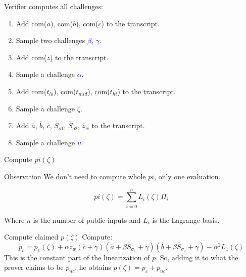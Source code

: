 \documentclass{zkdl-presentation-template}
\begin{document}
    \begin{frame} {Verifier computes all challenges:}
        \begin{enumerate}
            \item Add com($a$), com($b$), com($c$) to the transcript.
            \item Sample two challenges \textcolor{blue}{$\beta$, $\gamma$}.
            \item Add com($z$) to the transcript.
            \item Sample a challenge \textcolor{blue}{$\alpha$}.
            \item Add com($t_{lo}$), com($t_{mid}$), com($t_{hi}$) to the transcript.
            \item Sample a challenge \textcolor{blue}{$\zeta$}.
            \item Add $\bar{a}$, $\bar{b}$, $\bar{c}$, $\bar{S}_{o1}$, $\bar{S}_{o2}$, $\bar{z}_w$ to the transcript.
            \item Sample a challenge \textcolor{blue}{$\upsilon$}.
        \end{enumerate}
    \end{frame}

    \begin{frame} {Compute $pi(\zeta)$}
        \begin{block}{Observation}
            We don't need to compute whole $pi$, only one evaluation.
        \end{block}

        \begin{equation*}
            pi(\zeta) = \sum_{i=0}^{n} L_{i}(\zeta) \Pi_i
        \end{equation*}
        
        Where $n$ is the number of public inputs and $L_i$ is the Lagrange basis.
    \end{frame}

    \begin{frame} {Compute claimed $p(\zeta)$}
        Compute: 
        \[\bar{p}_c = p_1(\zeta) + \alpha z_{w} \left( \bar{c} + \gamma \right) \left( \bar{a} + \beta \bar{S}_{\sigma_1} + \gamma \right) \left( \bar{b} + \beta \bar{S}_{\sigma_2} + \gamma \right) - \alpha^2 L_1(\zeta)\]
        This is the constant part of the linearization of $p$. So, adding it to what the prover claims to be $\bar{p}_{nc}$, he obtains $p(\zeta) = \bar{p}_c + \bar{p}_{nc}$.
    \end{frame}
\end{document}
